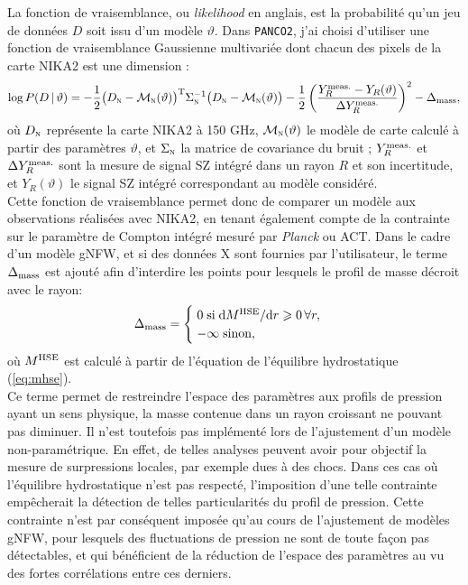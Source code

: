 La fonction de vraisemblance, ou \textit{likelihood} en anglais, est la probabilité qu'un jeu de données $D$ soit issu d'un modèle $\vartheta$.
Dans \texttt{PANCO2}, j'ai choisi d'utiliser une fonction de vraisemblance Gaussienne multivariée dont chacun des pixels de la carte NIKA2 est une dimension :
\begin{equation}
    \label{eq:panco:like}
    \mathrm{log} \, P(D \, | \, \vartheta)
    = - \frac{1}{2}
        \big(D_\textsc{n} - \mathcal{M}_\textsc{n}(\vartheta)\big)^{\rm T}
        \Sigma_\textsc{n}^{-1}
        \big(D_\textsc{n} - \mathcal{M}_\textsc{n}(\vartheta)\big)
      - \frac{1}{2}
        \left(\frac{Y_R^{\rm meas.} - Y_R(\vartheta)}{\Delta Y_R^{\rm meas.}}\right)^2
      - \Delta_{\rm mass},
\end{equation}
où $D_\textsc{n}$ représente la carte NIKA2 à 150 GHz, $\mathcal{M}_\textsc{n}(\vartheta)$ le modèle de carte calculé à partir des paramètres $\vartheta$, et $\Sigma_\textsc{n}$ la matrice de covariance du bruit ;
$Y_R^{\rm meas.}$ et $\Delta Y_R^{\rm meas.}$ sont la mesure de signal SZ intégré dans un rayon $R$ et son incertitude, et $Y_R(\vartheta)$ le signal SZ intégré correspondant au modèle considéré. \\
Cette fonction de vraisemblance permet donc de comparer un modèle aux observations réalisées avec NIKA2, en tenant également compte de la contrainte sur le paramètre de Compton intégré mesuré par \textit{Planck} ou ACT.
Dans le cadre d'un modèle gNFW, et si des données X sont fournies par l'utilisateur, le terme $\Delta_{\rm mass}$ est ajouté afin d'interdire les points pour lesquels le profil de masse décroit avec le rayon:
\begin{equation}
    \Delta_{\rm mass} =
        \begin{cases}
            \; 0 \;\text{si}\; \mathrm{d}M^{\rm HSE} / \mathrm{d}r \geqslant 0 \,\forall r, \\
            \; -\infty \;\text{sinon,}
        \end{cases}
\end{equation}
où $M^{\rm HSE}$ est calculé à partir de l'équation de l'équilibre hydrostatique (\ref{eq:mhse}). \\
Ce terme permet de restreindre l'espace des paramètres aux profils de pression ayant un sens physique, la masse contenue dans un rayon croissant ne pouvant pas diminuer.
Il n'est toutefois pas implémenté lors de l'ajustement d'un modèle non-paramétrique.
En effet, de telles analyses peuvent avoir pour objectif la mesure de surpressions locales, par exemple dues à des chocs.
Dans ces cas où l'équilibre hydrostatique n'est pas respecté, l'imposition d'une telle contrainte empêcherait la détection de telles particularités du profil de pression.
Cette contrainte n'est par conséquent imposée qu'au cours de l'ajustement de modèles gNFW, pour lesquels des fluctuations de pression ne sont de toute façon pas détectables, et qui bénéficient de la réduction de l'espace des paramètres au vu des fortes corrélations entre ces derniers.

